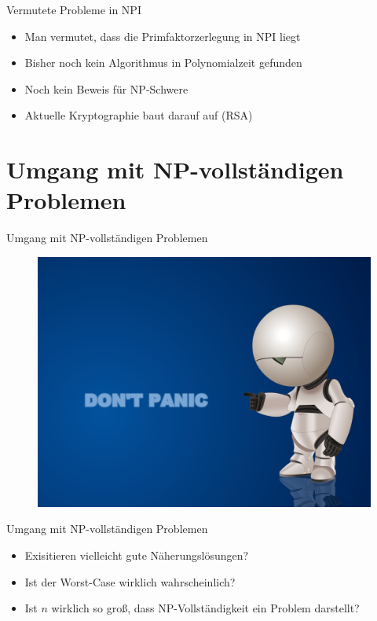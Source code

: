 \documentclass[ignorenonframetext,]{beamer}
\begin{document}
\begin{frame}{Vermutete Probleme in NPI}

\begin{itemize}
\itemsep1pt\parskip0pt
\item
  Man vermutet, dass die Primfaktorzerlegung in NPI liegt
\item
  Bisher noch kein Algorithmus in Polynomialzeit gefunden
\item
  Noch kein Beweis für NP-Schwere
\item
  Aktuelle Kryptographie baut darauf auf (RSA)
\end{itemize}

\end{frame}

\section[Umgang]{Umgang mit NP-vollständigen Problemen}

\begin{frame}{Umgang mit NP-vollständigen Problemen}

\begin{figure}[htbp]
\centering
\includegraphics{img/dont_panic.png}
\end{figure}

\end{frame}

\begin{frame}{Umgang mit NP-vollständigen Problemen}

\begin{itemize}
\itemsep1pt\parskip0pt
\item
  Exisitieren vielleicht gute Näherungslösungen?
\item
  Ist der Worst-Case wirklich wahrscheinlich?
\item
  Ist $n$ wirklich so groß, dass NP-Vollständigkeit ein Problem
  darstellt?
\end{itemize}

\end{frame}
\end{document}
